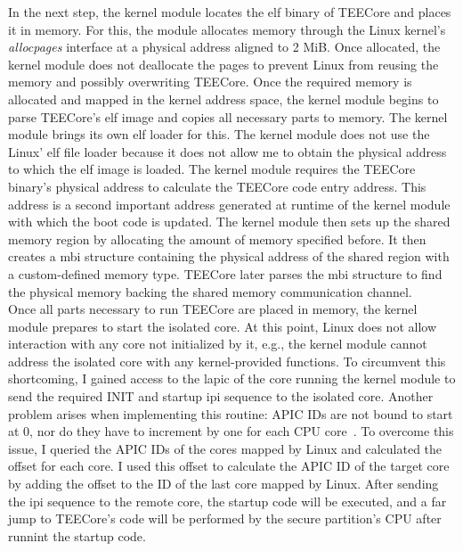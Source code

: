 In the next step, the kernel module locates the \gls{elf} binary of TEECore
and places it in memory. For this, the module allocates memory through the Linux
kernel's \textit{allocpages} interface at a physical address aligned to 2 MiB.
Once allocated, the kernel module does not deallocate the pages to prevent Linux
from reusing the memory and possibly overwriting TEECore. Once the required
memory is allocated and mapped in the kernel address space, the kernel module
begins to parse TEECore's \gls{elf} image and copies all necessary
parts to memory. The kernel module brings its own \gls{elf} loader for this. The
kernel module does not use the Linux' \gls{elf} file loader because it does not
allow me to obtain the physical address to which the \gls{elf} image is
loaded. The kernel module requires the TEECore binary's physical address to
calculate the TEECore code entry address. This address is a second important
address generated at runtime of the kernel module with which the boot code is
updated. The kernel module then sets up the shared memory region by allocating
the amount of memory specified before. It then creates a \gls{mbi} structure
containing the physical address of the shared region with a custom-defined
memory type. TEECore later parses the \gls{mbi} structure to find the physical
memory backing the shared memory communication channel.\\

Once all parts necessary to run TEECore are placed in memory, the kernel module
prepares to start the isolated core. At this point, Linux does not allow
interaction with any core not initialized by it, e.g., the kernel module cannot
address the isolated core with any kernel-provided functions. To circumvent this
shortcoming, I gained access to the \gls{lapic} of the core running the kernel
module to send the required INIT and startup \gls{ipi} sequence to the isolated
core. Another problem arises when implementing this routine: APIC IDs are not
bound to start at 0, nor do they have to increment by one for each CPU
core~\cite{intel_sdm}. To overcome this issue, I queried the APIC IDs of the
cores mapped by Linux and calculated the offset for each core. I used this
offset to calculate the APIC ID of the target core by adding the offset to the
ID of the last core mapped by Linux. After sending the \gls{ipi} sequence to the
remote core, the startup code will be executed, and a far jump to TEECore's code
will be performed by the secure partition's CPU after runnint the startup
code.\\

